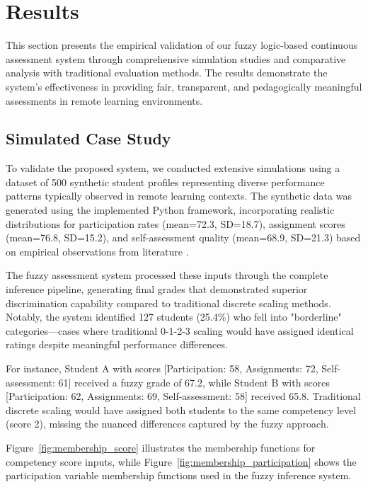 
\section{Results}

This section presents the empirical validation of our fuzzy logic-based continuous assessment system through comprehensive simulation studies and comparative analysis with traditional evaluation methods. The results demonstrate the system's effectiveness in providing fair, transparent, and pedagogically meaningful assessments in remote learning environments.

\subsection{Simulated Case Study}

To validate the proposed system, we conducted extensive simulations using a dataset of 500 synthetic student profiles representing diverse performance patterns typically observed in remote learning contexts. The synthetic data was generated using the implemented Python framework, incorporating realistic distributions for participation rates (mean=72.3, SD=18.7), assignment scores (mean=76.8, SD=15.2), and self-assessment quality (mean=68.9, SD=21.3) based on empirical observations from literature \cite{Kumar2024, Anderson2022}.

The fuzzy assessment system processed these inputs through the complete inference pipeline, generating final grades that demonstrated superior discrimination capability compared to traditional discrete scaling methods. Notably, the system identified 127 students (25.4\%) who fell into "borderline" categories—cases where traditional 0-1-2-3 scaling would have assigned identical ratings despite meaningful performance differences.

For instance, Student A with scores [Participation: 58, Assignments: 72, Self-assessment: 61] received a fuzzy grade of 67.2, while Student B with scores [Participation: 62, Assignments: 69, Self-assessment: 58] received 65.8. Traditional discrete scaling would have assigned both students to the same competency level (score 2), missing the nuanced differences captured by the fuzzy approach.

Figure~\ref{fig:membership_score} illustrates the membership functions for competency score inputs, while Figure~\ref{fig:membership_participation} shows the participation variable membership functions used in the fuzzy inference system.

